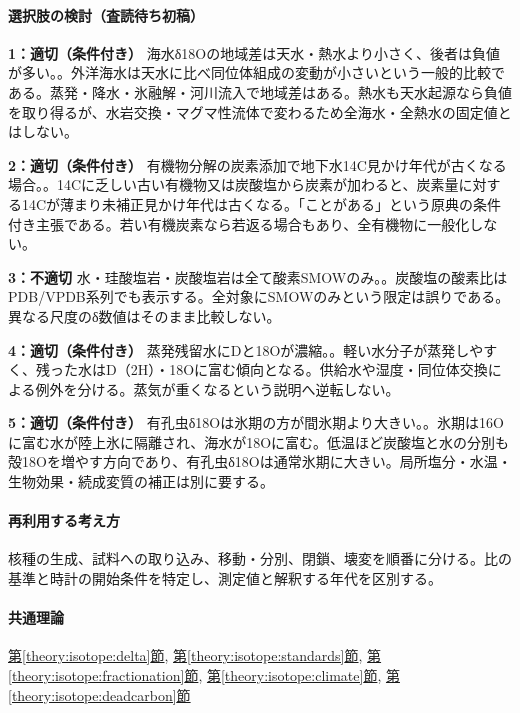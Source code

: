 \paragraph{選択肢の検討（査読待ち初稿）}\mbox{}\par

\noindent\textbf{1：適切（条件付き）} 海水δ18Oの地域差は天水・熱水より小さく、後者は負値が多い。。外洋海水は天水に比べ同位体組成の変動が小さいという一般的比較である。蒸発・降水・氷融解・河川流入で地域差はある。熱水も天水起源なら負値を取り得るが、水岩交換・マグマ性流体で変わるため全海水・全熱水の固定値とはしない。\par

\noindent\textbf{2：適切（条件付き）} 有機物分解の炭素添加で地下水14C見かけ年代が古くなる場合。。14Cに乏しい古い有機物又は炭酸塩から炭素が加わると、炭素量に対する14Cが薄まり未補正見かけ年代は古くなる。「ことがある」という原典の条件付き主張である。若い有機炭素なら若返る場合もあり、全有機物に一般化しない。\par

\noindent\textbf{3：不適切} 水・珪酸塩岩・炭酸塩岩は全て酸素SMOWのみ。。炭酸塩の酸素比はPDB/VPDB系列でも表示する。全対象にSMOWのみという限定は誤りである。異なる尺度のδ数値はそのまま比較しない。\par

\noindent\textbf{4：適切（条件付き）} 蒸発残留水にDと18Oが濃縮。。軽い水分子が蒸発しやすく、残った水はD（2H）・18Oに富む傾向となる。供給水や湿度・同位体交換による例外を分ける。蒸気が重くなるという説明へ逆転しない。\par

\noindent\textbf{5：適切（条件付き）} 有孔虫δ18Oは氷期の方が間氷期より大きい。。氷期は16Oに富む水が陸上氷に隔離され、海水が18Oに富む。低温ほど炭酸塩と水の分別も殻18Oを増やす方向であり、有孔虫δ18Oは通常氷期に大きい。局所塩分・水温・生物効果・続成変質の補正は別に要する。\par

\paragraph{再利用する考え方} 核種の生成、試料への取り込み、移動・分別、閉鎖、壊変を順番に分ける。比の基準と時計の開始条件を特定し、測定値と解釈する年代を区別する。

\paragraph{共通理論} \hyperref[theory:isotope:delta]{第\ref*{theory:isotope:delta}節}, \hyperref[theory:isotope:standards]{第\ref*{theory:isotope:standards}節}, \hyperref[theory:isotope:fractionation]{第\ref*{theory:isotope:fractionation}節}, \hyperref[theory:isotope:climate]{第\ref*{theory:isotope:climate}節}, \hyperref[theory:isotope:deadcarbon]{第\ref*{theory:isotope:deadcarbon}節}

